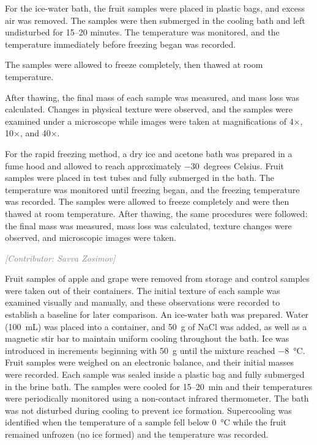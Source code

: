 \documentclass[12pt, a4paper]{article}
\newcommand{\contributor}[1]{\vspace{4pt}\noindent\textcolor{gray}{\small\textit{[Contributor: #1]}}\vspace{2pt}}
\begin{document}
For the ice-water bath, the fruit samples were placed in plastic bags,
and excess air was removed. The samples were then submerged in the
cooling bath and left undisturbed for 15--20 minutes. The temperature
was monitored, and the temperature immediately before freezing began was
recorded.


The samples were allowed to freeze completely, then thawed at room
temperature.


After thawing, the final mass of each sample was measured, and mass loss
was calculated. Changes in physical texture were observed, and the
samples were examined under a microscope while images were taken at
magnifications of 4$\times$, 10$\times$, and 40$\times$.

For the rapid freezing method, a dry ice and acetone bath was prepared
in a fume hood and allowed to reach approximately $-$30~degrees Celsius.
Fruit samples were placed in test tubes and fully submerged in the bath.
The temperature was monitored until freezing began, and the freezing
temperature was recorded. The samples were allowed to freeze completely
and were then thawed at room temperature. After thawing, the same
procedures were followed: the final mass was measured, mass loss was
calculated, texture changes were observed, and microscopic images were
taken.

\contributor{Savva Zosimov}

Fruit samples of apple and grape were removed from storage and control
samples were taken out of their containers. The initial texture of each
sample was examined visually and manually, and these observations were
recorded to establish a baseline for later comparison. An ice-water bath
was prepared. Water (100~mL) was placed into a container, and 50~g of
NaCl was added, as well as a magnetic stir bar to maintain uniform
cooling throughout the bath. Ice was introduced in increments beginning
with 50~g until the mixture reached $-$8~°C. Fruit samples were weighed
on an electronic balance, and their initial masses were recorded. Each
sample was sealed inside a plastic bag and fully submerged in the brine
bath. The samples were cooled for 15--20~min and their temperatures were
periodically monitored using a non-contact infrared thermometer. The
bath was not disturbed during cooling to prevent ice formation.
Supercooling was identified when the temperature of a sample fell below
0~°C while the fruit remained unfrozen (no ice formed) and the
temperature was recorded.
\end{document}
